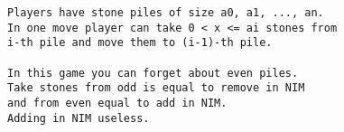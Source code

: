 \begin{lstlisting}[language=raw,caption={lader-nim.txt}]
Players have stone piles of size a0, a1, ..., an.
In one move player can take 0 < x <= ai stones from 
i-th pile and move them to (i-1)-th pile.

In this game you can forget about even piles.
Take stones from odd is equal to remove in NIM
and from even equal to add in NIM.
Adding in NIM useless.
\end{lstlisting}
